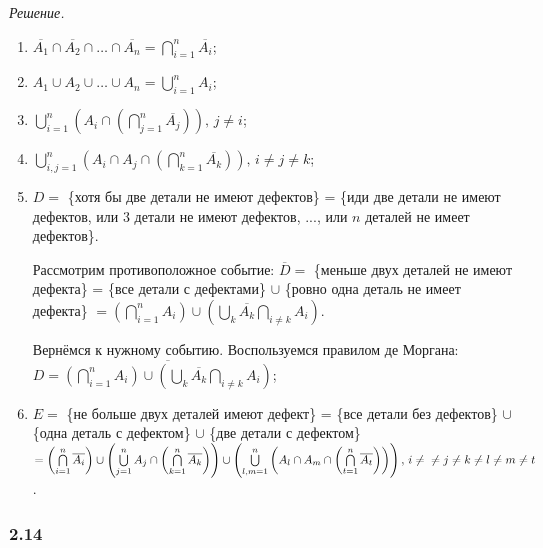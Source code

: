 \textit{Решение.}
\begin{enumerate}[label=\alph*)]
\item $ \overline{A_1} \cap \overline{A_2} \cap \dotsc \cap \overline{A_n} =
\bigcap \limits_{i=1}^n \overline{A_i}$;

\item $ A_1 \cup A_2 \cup \dotsc \cup A_n =
\bigcup \limits_{i=1}^n A_i $;

\item $ \bigcup \limits_{i=1}^n \left( A_i \cap \left( \bigcap \limits_{j=1}^n \overline{A_j} \right) \right), \, j \neq i$;

\item $ \bigcup \limits_{i, j=1}^n \left( A_i \cap A_j \cap \left( \bigcap \limits_{k=1}^n \overline{A_k} \right) \right), \, i \neq j \neq k$;

\item $D =$ \{хотя бы две детали не имеют дефектов\} = \{иди две детали не имеют дефектов, или 3 детали не имеют дефектов, ..., или $n$ деталей не имеет дефектов\}.

Рассмотрим противоположное событие: $ \overline{D} =$ \{меньше двух деталей не имеют дефекта\} = \{все детали с дефектами\} $ \cup $
\{ровно одна деталь не имеет дефекта\} $= \left( \bigcap \limits_{i=1}^n A_i \right) \cup \left( \bigcup \limits_k \overline{A_k} \bigcap \limits_{i \neq k} A_i \right) $.

Вернёмся к нужному событию.
Воспользуемся правилом де Моргана:
$D =
\overline{ \left( \bigcap \limits_{i=1}^n A_i \right) \cup \left( \bigcup \limits_k \overline{A_k} \bigcap \limits_{i \neq k} A_i \right) }$; 

\item $E =$ \{не больше двух деталей имеют дефект\} = \{все детали без дефектов\} $ \cup $ \{одна деталь с дефектом\} $ \cup
$ \{две детали с дефектом\}
$= \left( \bigcap \limits_{i=1}^n \overline{A_i} \right) \cup
\left( \bigcup \limits_{j=1}^n A_j \cap \left( \bigcap \limits_{k=1}^n \overline{A_k} \right) \right) \cup
\left( \bigcup \limits_{l,m=1}^n \left( A_l \cap A_m \cap \left( \bigcap \limits_{t=1}^n \overline{A_t} \right) \right) \right), \, i \neq \\
\neq j \neq k \neq l \neq m \neq t$.
\end{enumerate}

\subsubsection*{2.14}


